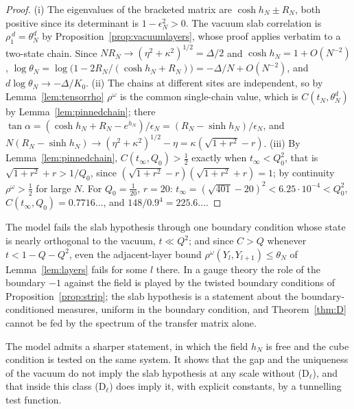 \begin{proof}
(i) The eigenvalues of the bracketed matrix are $\cosh h_N\pm R_N$, both
positive since its determinant is $1-\epsilon_N^2>0$. The vacuum slab
correlation is $\rho_1^{\,d}=\theta_N^d$ by Proposition~\ref{prop:vacuumlayers},
whose proof applies verbatim to a two-state chain. Since $NR_N\to
(\eta^2+\kappa^2)^{1/2}=\Delta/2$ and $\cosh h_N=1+O(N^{-2})$,
$\log\theta_N=\log\bigl(1-2R_N/(\cosh h_N+R_N)\bigr)=-\Delta/N+O(N^{-2})$,
and $d\log\theta_N\to-\Delta/K_0$.
(ii) The chains at different sites are independent, so by
Lemma~\ref{lem:tensorrho} $\rho^\omega$ is the common single-chain value,
which is $C(t_N,\theta_N^d)$ by Lemma~\ref{lem:pinnedchain}; there $\tan
\alpha=(\cosh h_N+R_N-e^{h_N})/\epsilon_N=(R_N-\sinh h_N)/\epsilon_N$, and
$N(R_N-\sinh h_N)\to(\eta^2+\kappa^2)^{1/2}-\eta=\kappa(\sqrt{1+r^2}-r)$.
(iii) By Lemma~\ref{lem:pinnedchain}, $C(t_\infty,Q_0)>\frac12$ exactly when
$t_\infty<Q_0^2$, that is $\sqrt{1+r^2}+r>1/Q_0$, since $(\sqrt{1+r^2}-r)
(\sqrt{1+r^2}+r)=1$; by continuity $\rho^\omega>\frac12$ for large $N$. For
$Q_0=\frac1{20}$, $r=20$: $t_\infty=(\sqrt{401}-20)^2<6.25\cdot10^{-4}<Q_0^2$,
$C(t_\infty,Q_0)=0.7716\ldots$, and $148/0.9^4=225.6\ldots$.
\end{proof}

The model fails the slab hypothesis through one boundary condition whose
state is nearly orthogonal to the vacuum, $t\ll Q^2$; and since $C>Q$
whenever $t<1-Q-Q^2$, even the adjacent-layer bound $\rho^\omega(Y_l,Y_{l+1})
\le\theta_N$ of Lemma~\ref{lem:layers} fails for some $l$ there. In a gauge
theory the role of the boundary $-1$ against the field is played by the
twisted boundary conditions of Proposition~\ref{prop:strip}; the slab
hypothesis is a statement about the boundary-conditioned measures, uniform
in the boundary condition, and Theorem~\ref{thm:D} cannot be fed by the
spectrum of the transfer matrix alone.

The model admits a sharper statement, in which the field $h_N$ is free and
the cube condition is tested on the same system. It shows that the gap and
the uniqueness of the vacuum do not imply the slab hypothesis at any scale
without (D$_\ell$), and that inside this class (D$_\ell$) does imply it,
with explicit constants, by a tunnelling test function.

